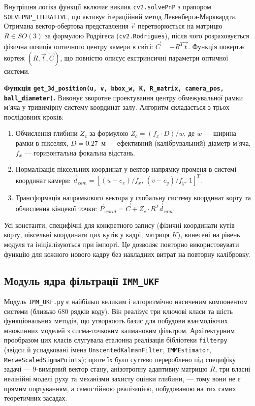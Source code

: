 Внутрішня логіка функції включає виклик \texttt{cv2.solvePnP} з прапором
\texttt{SOLVEPNP\_ITERATIVE}, що активує ітераційний метод Левенберга-Марквардта.
Отримана вектор-обертова представлення $\vec{r}$ перетворюється на матрицю $R \in
SO(3)$ за формулою Родрігеса (\texttt{cv2.Rodrigues}), після чого розраховується
фізична позиція оптичного центру камери в світі: $\vec{C} = -R^T \vec{t}$. Функція
повертає кортеж $(R, \vec{t}, \vec{C})$, що повністю описує екстринсичні параметри
оптичної системи.

\textbf{Функція \texttt{get\_3d\_position(u, v, bbox\_w, K, R\_matrix, camera\_pos,
ball\_diameter)}.} Виконує зворотне проектування центру обмежувальної рамки м'яча у
тривимірну систему координат залу. Алгоритм складається з трьох послідовних кроків:
\begin{enumerate}
    \item Обчислення глибини $Z_c$ за формулою $Z_c = (f_x \cdot D) / w$, де
    $w$ --- ширина рамки в пікселях, $D = 0.27$~м --- ефективний (калібрувальний)
    діаметр м'яча, $f_x$ --- горизонтальна фокальна відстань.
    \item Нормалізація піксельних координат у вектор напрямку променя в системі
    координат камери: $\vec{d}_{cam} = [(u - c_x)/f_x,\, (v - c_y)/f_y,\, 1]^T$.
    \item Трансформація напрямкового вектора у глобальну систему координат корту
    та обчислення кінцевої точки: $\vec{P}_{world} = \vec{C} + Z_c \cdot R^T
    \vec{d}_{cam}$.
\end{enumerate}

Усі константи, специфічні для конкретного запису (фізичні координати кутів корту,
піксельні координати цих кутів у кадрі, матриця $K$), винесені на рівень модуля та
ініціалізуються при імпорті. Це дозволяє повторно використовувати функцію для
кожного нового кадру без накладних витрат на повторну калібровку.

\subsection{Модуль ядра фільтрації \texttt{IMM\_UKF}}

Модуль \texttt{IMM\_UKF.py} є найбільш великим і алгоритмічно насиченим компонентом
системи (близько 680 рядків коду). Він реалізує три ключові класи та шість функціональних
методів, що утворюють базис для побудови взаємодіючих множинних моделей з
сигма-точковим калмановим фільтром. Архітектурним прообразом цих класів слугувала
еталонна реалізація бібліотеки \texttt{filterpy}~\cite{labbe_filterpy,labbe_kalman}
(звідси й успадковані імена \texttt{UnscentedKalmanFilter}, \texttt{IMMEstimator},
\texttt{MerweScaledSigmaPoints}); проте їх було суттєво перероблено під специфіку
задачі --- 9-вимірний вектор стану, анізотропну адаптивну матрицю $R$, три власні
нелінійні моделі руху та механізми захисту оцінки глибини, --- тому вони не є прямим
портуванням, а самостійною реалізацією, побудованою на тих самих теоретичних засадах.

